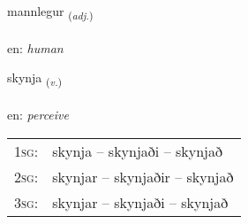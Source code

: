 \documentclass[frontgrid, backgrid]{flacards}\usepackage[]{graphicx}\usepackage[]{color}
\begin{document}
\renewcommand{\flhead}{\vskip5pt \fboxsep=0pt {\small\bfseries\footnotesize Lýsingarorð | Adjective}}
\renewcommand{\fcfoot}{\vskip5pt \fboxsep=0pt \hspace{2pt}{\small\bfseries\footnotesize 2K}}

\renewcommand{\blhead}{\vskip5pt {\small\bfseries\footnotesize Lýsingarorð | Adjective }}
\renewcommand{\bcfoot}{\vskip5pt \hspace{2pt}{\small\bfseries\footnotesize 2K}}


{mannlegur \small{\textsubscript{(\textit{adj.})}} \\[1ex] %
\textphonetic{[manlɛɣʏr]} \\
en: \emph{human} \\  [2ex]
\renewcommand*{\arraystretch}{0.8}
}

\renewcommand{\flhead}{\vskip5pt \fboxsep=0pt {\small\bfseries\footnotesize Sagnorð | Verb}}
\renewcommand{\fcfoot}{\vskip5pt \fboxsep=0pt \hspace{2pt}{\small\bfseries\footnotesize 2K}}

\renewcommand{\blhead}{\vskip5pt {\small\bfseries\footnotesize Sagnorð | Verb }}
\renewcommand{\bcfoot}{\vskip5pt \hspace{2pt}{\small\bfseries\footnotesize 2K}}


{skynja \small{\textsubscript{(\textit{v.})}} \\[1ex] %
\textphonetic{[scɪnja]} \\
en: \emph{perceive} \\  [2ex]
\renewcommand*{\arraystretch}{0.8}
\begin{tabular}{p{1cm}l}
\textsc{1sg}: & skynja -- skynjaði -- skynjað \\ 
\textsc{2sg}: & skynjar -- skynjaðir -- skynjað \\ 
\textsc{3sg}: & skynjar -- skynjaði -- skynjað \\ 
\end{tabular}
}
\end{document}
